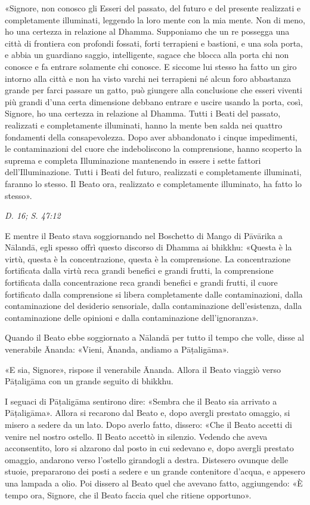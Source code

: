 «Signore, non conosco gli Esseri del passato, del futuro e del presente
realizzati e completamente illuminati, leggendo la loro mente con la mia
mente. Non di meno, ho una certezza in relazione al Dhamma. Supponiamo
che un re possegga una città di frontiera con profondi fossati, forti
terrapieni e bastioni, e una sola porta, e abbia un guardiano saggio,
intelligente, sagace che blocca alla porta chi non conosce e fa entrare
solamente chi conosce. E siccome lui stesso ha fatto un giro intorno
alla città e non ha visto varchi nei terrapieni né alcun foro abbastanza
grande per farci passare un gatto, può giungere alla conclusione che
esseri viventi più grandi d’una certa dimensione debbano entrare e
uscire usando la porta, così, Signore, ho una certezza in relazione al
Dhamma. Tutti i Beati del passato, realizzati e completamente
illuminati, hanno la mente ben salda nei quattro fondamenti della
consapevolezza. Dopo aver abbandonato i cinque impedimenti, le
contaminazioni del cuore che indeboliscono la comprensione, hanno
scoperto la suprema e completa Illuminazione mantenendo in essere i
sette fattori dell’Illuminazione. Tutti i Beati del futuro, realizzati e
completamente illuminati, faranno lo stesso. Il Beato ora, realizzato e
completamente illuminato, ha fatto lo stesso».


\emph{D. 16; S. 47:12}


E mentre il Beato stava soggiornando nel Boschetto di Mango di Pāvārika
a Nālandā, egli spesso offrì questo discorso di Dhamma ai bhikkhu:
«Questa è la virtù, questa è la concentrazione, questa è la
comprensione. La concentrazione fortificata dalla virtù reca grandi
benefici e grandi frutti, la comprensione fortificata dalla
concentrazione reca grandi benefici e grandi frutti, il cuore
fortificato dalla comprensione si libera completamente dalle
contaminazioni, dalla contaminazione del desiderio sensoriale, dalla
contaminazione dell’esistenza, dalla contaminazione delle opinioni e
dalla contaminazione dell’ignoranza».


Quando il Beato ebbe soggiornato a Nālandā per tutto il tempo che volle,
disse al venerabile Ānanda: «Vieni, Ānanda, andiamo a Pāṭaligāma».


«E sia, Signore», rispose il venerabile Ānanda. Allora il Beato viaggiò
verso Pāṭaligāma con un grande seguito di bhikkhu.


I seguaci di Pāṭaligāma sentirono dire: «Sembra che il Beato sia
arrivato a Pāṭaligāma». Allora si recarono dal Beato e, dopo avergli
prestato omaggio, si misero a sedere da un lato. Dopo averlo fatto,
dissero: «Che il Beato accetti di venire nel nostro ostello. Il Beato
accettò in silenzio. Vedendo che aveva acconsentito, loro si alzarono
dal posto in cui sedevano e, dopo avergli prestato omaggio, andarono
verso l’ostello girandogli a destra. Distesero ovunque delle stuoie,
prepararono dei posti a sedere e un grande contenitore d’acqua, e
appesero una lampada a olio. Poi dissero al Beato quel che avevano
fatto, aggiungendo: «È tempo ora, Signore, che il Beato faccia quel che
ritiene opportuno».


